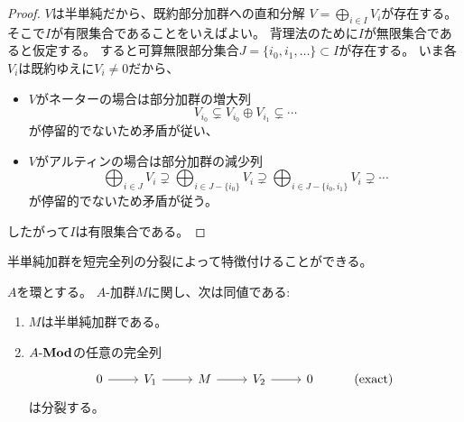 \documentclass[report]{jlreq}
\begin{document}
\begin{proof}
    $V$は半単純だから、既約部分加群への直和分解
    $V = \bigoplus_{i \in I} V_i$が存在する。
    そこで$I$が有限集合であることをいえばよい。
    背理法のために$I$が無限集合であると仮定する。
    すると可算無限部分集合$J = \{ i_0, i_1, \dots \} \subset I$が存在する。
    いま各$V_i$は既約ゆえに$V_i \neq 0$だから、
    \begin{itemize}
        \item $V$がネーターの場合は部分加群の増大列
            \begin{equation}
                V_{i_0}
                    \subsetneq V_{i_0} \oplus V_{i_1}
                    \subsetneq \cdots
            \end{equation}
            が停留的でないため矛盾が従い、
        \item $V$がアルティンの場合は部分加群の減少列
            \begin{equation}
                \bigoplus_{i \in J} V_i
                    \supsetneq \bigoplus_{i \in J - \{ i_0 \}} V_i
                    \supsetneq \bigoplus_{i \in J - \{ i_0, i_1 \}} V_i
                    \supsetneq \cdots
            \end{equation}
            が停留的でないため矛盾が従う。
    \end{itemize}
    したがって$I$は有限集合である。
\end{proof}

半単純加群を短完全列の分裂によって特徴付けることができる。

\begin{theorem}[半単純加群の特徴付け]
    $A$を環とする。
    $A$-加群$M$に関し、次は同値である:
    \begin{enumerate}
        \item $M$は半単純加群である。
        \item $A\text{-}\mathbf{Mod}$の任意の完全列
            \begin{equation}
                \begin{tikzcd}
                    0 \ar{r}
                        & V_1 \ar{r}
                        & M \ar{r}
                        & V_2 \ar{r}
                        & 0
                        & (\text{exact})
                \end{tikzcd}
            \end{equation}
            は分裂する。
    \end{enumerate}
\end{theorem}
\end{document}
